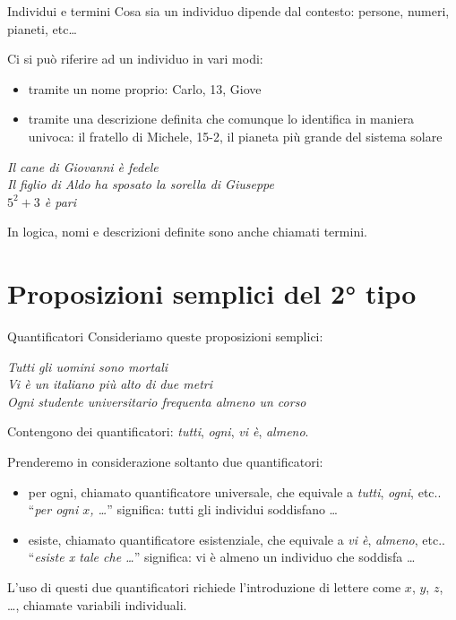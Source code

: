 \documentclass[aspectratio=169,10pt,dvipsnames]{beamer}
\begin{document}
\begin{frame}{Individui e termini}
	Cosa sia un individuo dipende dal contesto: persone, numeri, pianeti, etc\ldots

	\pause\medskip
	Ci si può riferire ad un individuo in vari modi:
	\begin{itemize}
		\item tramite un \alert{nome} proprio: Carlo, 13, Giove
		\item tramite una \alert{descrizione definita} che comunque lo identifica in maniera univoca: il fratello di Michele, 15-2, il pianeta più grande del sistema solare
	\end{itemize}
	\begin{example}
		\centering
		\itshape
		\alert{Il cane di Giovanni} è fedele\\
		\alert{Il figlio di Aldo} ha sposato \alert{la sorella di Giuseppe}\\
		\alert{$5^2+3$} è pari
	\end{example}
	\pause
	In logica, nomi e descrizioni definite sono anche chiamati \alert{termini}.
\end{frame}

\section{Proposizioni semplici del 2° tipo}

\begin{frame}{Quantificatori}
	Consideriamo queste proposizioni semplici:
	\begin{center}
		\itshape
		Tutti gli uomini sono mortali\\
		Vi è un italiano più alto di due metri\\
		Ogni studente universitario frequenta almeno un corso
	\end{center}
	Contengono dei \alert{quantificatori}: \emph{tutti}, \emph{ogni}, \emph{vi è}, \emph{almeno}.

	\pause
	\medskip
	Prenderemo in considerazione soltanto due quantificatori:
	\begin{itemize}
		\item \alert{per ogni}, chiamato \alert{quantificatore universale}, che equivale a \emph{tutti}, \emph{ogni}, etc..\\[0.1cm]
		``\emph{per ogni $x$, \ldots}'' significa: tutti gli individui soddisfano \ldots
		\item \alert{esiste}, chiamato \alert{quantificatore esistenziale}, che equivale a \emph{vi è}, \emph{almeno}, etc..\\[0.1cm]
		``\emph{esiste x tale che \ldots}'' significa: vi è almeno un individuo che soddisfa \ldots
	\end{itemize}

	\medskip
	L'uso di questi due quantificatori richiede l'introduzione di lettere come $x$, $y$, $z$, \ldots, chiamate \alert{variabili individuali}.
\end{frame}
\end{document}
